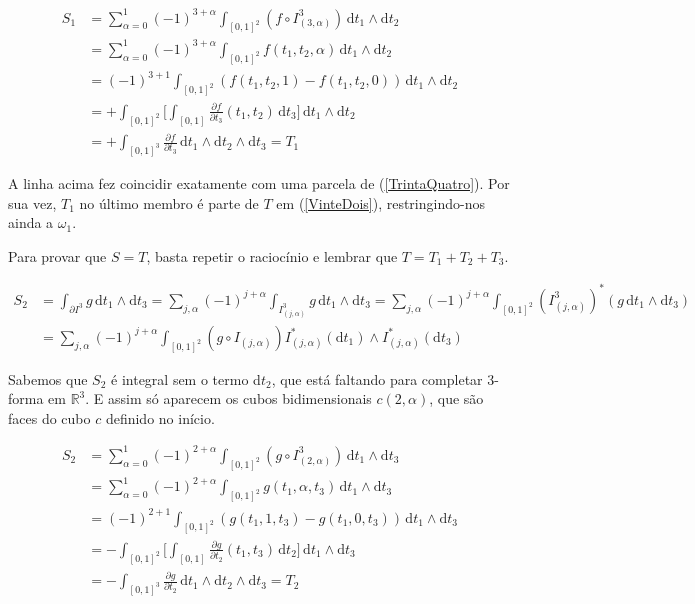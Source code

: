 \documentclass[12pt,a4paper]{article}
\begin{document}
		\begin{align}
			S_1 &= \sum_{\alpha = 0}^1 (-1)^{3 + \alpha} \int_{[0,1]^2} (f \circ I^3_{(3, \alpha)}) \,\mathrm{d}t_1 \wedge \mathrm{d}t_2 \\
			&= \sum_{\alpha = 0}^1 (-1)^{3 + \alpha} \int_{[0,1]^2} f(t_1, t_2, \alpha) \,\mathrm{d}t_1 \wedge \mathrm{d}t_2 \\
			&= (-1)^{3 + 1} \int_{[0,1]^2} (f(t_1, t_2, 1) - f(t_1, t_2, 0)) \,\mathrm{d}t_1 \wedge \mathrm{d}t_2 \\
			&= + \int_{[0,1]^2} \biggl[ \int_{[0,1]} \frac{\partial f}{\partial t_3} (t_1, t_2) \,\mathrm{d}t_3 \biggl] \,\mathrm{d}t_1 \wedge \mathrm{d}t_2 \\
			&= + \int_{[0,1]^3} \frac{\partial f}{\partial t_3} \,\mathrm{d}t_1 \wedge \mathrm{d}t_2 \wedge \mathrm{d}t_3 = T_1
		\end{align}
		
		A linha acima fez coincidir exatamente com uma parcela de (\ref{TrintaQuatro}). Por sua vez, $T_1$ no \'ultimo membro \'e parte de $T$ em (\ref{VinteDois}), restringindo-nos ainda a $\omega_1$.
		
		Para provar que $S = T$, basta repetir o racioc\'inio e lembrar que $T = T_1 + T_2 + T_3$.
		
		\begin{align}
			S_2 &= \int_{\partial I^3} g \,\mathrm{d}t_1 \wedge \mathrm{d}t_3 = \sum_{j, \alpha} (-1)^{j + \alpha} \int_{I^3_{(j, \alpha)}} g \,\mathrm{d}t_1 \wedge \mathrm{d}t_3 = \sum_{j, \alpha} (-1)^{j + \alpha} \int_{[0,1]^2} (I_{(j, \alpha)}^{3})^* (g \,\mathrm{d}t_1 \wedge \mathrm{d}t_3) \\
			&= \sum_{j, \alpha} (-1)^{j + \alpha} \int_{[0,1]^2} (g \circ I_{(j, \alpha)}) I^*_{(j, \alpha)} (\mathrm{d}t_1) \wedge I^*_{(j, \alpha)} (\mathrm{d}t_3)
		\end{align}
		
		Sabemos que $S_2$ \'e integral sem o termo d$t_2$, que est\'a faltando para completar 3-forma em $\mathbb{R}^3$. E assim s\'o aparecem os cubos bidimensionais $c(2, \alpha)$, que s\~ao faces do cubo $c$ definido no in\'icio.

		\begin{align}
			S_2 &= \sum_{\alpha = 0}^1 (-1)^{2 + \alpha} \int_{[0,1]^2} (g \circ I^3_{(2, \alpha)}) \,\mathrm{d}t_1 \wedge \mathrm{d}t_3 \\
			&= \sum_{\alpha = 0}^1 (-1)^{2 + \alpha} \int_{[0,1]^2} g(t_1, \alpha, t_3) \,\mathrm{d}t_1 \wedge \mathrm{d}t_3 \\
			&= (-1)^{2 + 1} \int_{[0,1]^2} (g(t_1, 1, t_3) - g(t_1, 0, t_3)) \,\mathrm{d}t_1 \wedge \mathrm{d}t_3 \\
			&= - \int_{[0,1]^2} \biggl[ \int_{[0,1]} \frac{\partial g}{\partial t_2} (t_1, t_3) \,\mathrm{d}t_2 \biggl] \,\mathrm{d}t_1 \wedge \mathrm{d}t_3 \\
			&= - \int_{[0,1]^3} \frac{\partial g}{\partial t_2} \,\mathrm{d}t_1 \wedge \mathrm{d}t_2 \wedge \mathrm{d}t_3 = T_2
		\end{align}
		
\end{document}
